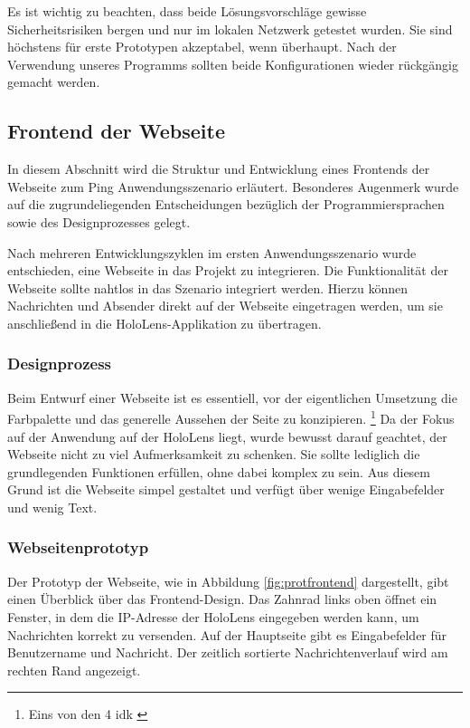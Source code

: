 \begin{itemize}
Es ist wichtig zu beachten, dass beide Lösungsvorschläge gewisse Sicherheitsrisiken bergen und nur im lokalen Netzwerk getestet wurden. Sie sind höchstens für erste Prototypen akzeptabel, wenn überhaupt. Nach der Verwendung unseres Programms sollten beide Konfigurationen wieder rückgängig gemacht werden.

\subsection{\label{sec:FrontendWebseite}Frontend der Webseite}
In diesem Abschnitt wird die Struktur und Entwicklung eines Frontends der Webseite zum Ping Anwendungsszenario erläutert. Besonderes Augenmerk wurde auf die zugrundeliegenden Entscheidungen bezüglich der Programmiersprachen sowie des Designprozesses gelegt.

Nach mehreren Entwicklungszyklen im ersten Anwendungsszenario wurde entschieden, eine Webseite in das Projekt zu integrieren. Die Funktionalität der Webseite sollte nahtlos in das Szenario integriert werden. Hierzu können Nachrichten und Absender direkt auf der Webseite eingetragen werden, um sie anschließend in die HoloLens-Applikation zu übertragen.

\subsubsection{Designprozess}
Beim Entwurf einer Webseite ist es essentiell, vor der eigentlichen Umsetzung die Farbpalette und das generelle Aussehen der Seite zu konzipieren. \footnote{Eins von den 4 idk \cite{.}} Da der Fokus auf der Anwendung auf der HoloLens liegt, wurde bewusst darauf geachtet, der Webseite nicht zu viel Aufmerksamkeit zu schenken. Sie sollte lediglich die grundlegenden Funktionen erfüllen, ohne dabei komplex zu sein. Aus diesem Grund ist die Webseite simpel gestaltet und verfügt über wenige Eingabefelder und wenig Text.

\subsubsection*{Webseitenprototyp}
Der Prototyp der Webseite, wie in Abbildung \ref{fig:protfrontend} dargestellt, gibt einen Überblick über das Frontend-Design. Das Zahnrad links oben öffnet ein Fenster, in dem die IP-Adresse der HoloLens eingegeben werden kann, um Nachrichten korrekt zu versenden. Auf der Hauptseite gibt es Eingabefelder für Benutzername und Nachricht. Der zeitlich sortierte Nachrichtenverlauf wird am rechten Rand angezeigt.


\end{itemize}

